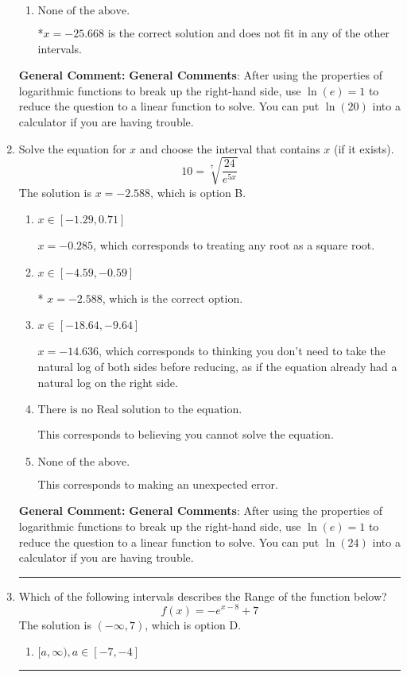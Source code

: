 \documentclass{extbook}[14pt]
\newcommand{\litem}[1]{\item #1

\rule{\textwidth}{0.4pt}}
\begin{document}
\begin{enumerate}
{\begin{enumerate}[label=\Alph*.]
This corresponds to believing you cannot solve the equation.
\item \( \text{None of the above.} \)

*$x = -25.668$ is the correct solution and does not fit in any of the other intervals.
\end{enumerate}

\textbf{General Comment:} \textbf{General Comments}: After using the properties of logarithmic functions to break up the right-hand side, use $\ln(e) = 1$ to reduce the question to a linear function to solve. You can put $\ln(20)$ into a calculator if you are having trouble.
}
\litem{
 Solve the equation for $x$ and choose the interval that contains $x$ (if it exists).
\[  10 = \sqrt[7]{\frac{24}{e^{5x}}} \]The solution is \( x = -2.588 \), which is option B.\begin{enumerate}[label=\Alph*.]
\item \( x \in [-1.29, 0.71] \)

$x = -0.285$, which corresponds to treating any root as a square root.
\item \( x \in [-4.59, -0.59] \)

* $x = -2.588$, which is the correct option.
\item \( x \in [-18.64, -9.64] \)

$x = -14.636$, which corresponds to thinking you don't need to take the natural log of both sides before reducing, as if the equation already had a natural log on the right side.
\item \( \text{There is no Real solution to the equation.} \)

This corresponds to believing you cannot solve the equation.
\item \( \text{None of the above.} \)

This corresponds to making an unexpected error.
\end{enumerate}

\textbf{General Comment:} \textbf{General Comments}: After using the properties of logarithmic functions to break up the right-hand side, use $\ln(e) = 1$ to reduce the question to a linear function to solve. You can put $\ln(24)$ into a calculator if you are having trouble.
}
\litem{
Which of the following intervals describes the Range of the function below?
\[ f(x) = -e^{x-8}+7 \]The solution is \( (-\infty, 7) \), which is option D.\begin{enumerate}[label=\Alph*.]
\item \( [a, \infty), a \in [-7, -4] \)


\end{enumerate}}
\end{enumerate}
\end{document}
